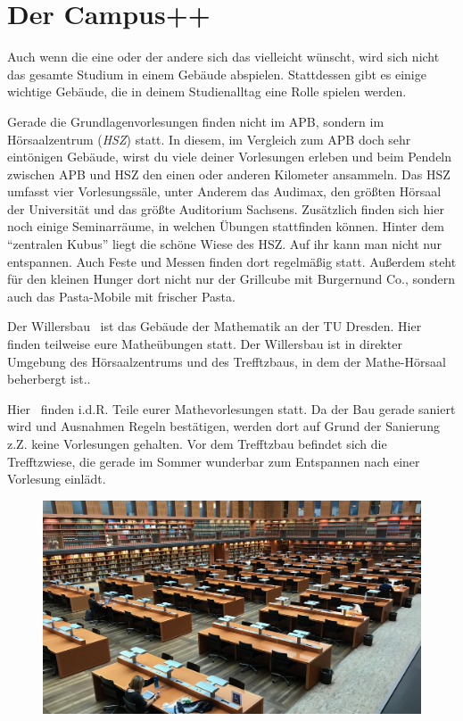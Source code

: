 \chapter*{Der Campus++}

Auch wenn die eine oder der andere sich das vielleicht wünscht, wird sich nicht das gesamte Studium in einem Gebäude abspielen.
Stattdessen gibt es einige wichtige Gebäude, die in deinem Studienalltag eine Rolle spielen werden.

Gerade die Grundlagenvorlesungen finden nicht im APB, sondern im Hörsaalzentrum (\emph{HSZ}) statt.
In diesem, im Vergleich zum APB doch sehr eintönigen Gebäude, wirst du viele deiner Vorlesungen erleben und beim Pendeln zwischen APB und HSZ den einen oder anderen Kilometer ansammeln.
Das HSZ umfasst vier Vorlesungssäle, unter Anderem das Audimax, den größten Hörsaal der Universität und das größte Auditorium Sachsens.
Zusätzlich finden sich hier noch einige Seminarräume, in welchen Übungen stattfinden können. Hinter dem \enquote{zentralen Kubus} liegt die schöne Wiese des HSZ. Auf ihr kann man nicht nur entspannen. Auch Feste und Messen finden dort regelmäßig statt.
Außerdem steht für den kleinen Hunger dort nicht nur
der Grillcube mit Burgernund Co., sondern auch das Pasta-Mobile mit frischer Pasta.

Der Willersbau~ ist das Gebäude der Mathematik an der TU Dresden. Hier finden teilweise eure Matheübungen statt. Der Willersbau ist in direkter Umgebung
des Hörsaalzentrums und des Trefftzbaus, in dem der Mathe-Hörsaal beherbergt ist..

Hier~ finden i.d.R. Teile eurer Mathevorlesungen statt. Da der Bau gerade saniert wird und Ausnahmen Regeln bestätigen, werden dort auf Grund der Sanierung z.Z. keine Vorlesungen gehalten. Vor dem Trefftzbau befindet sich die Trefftzwiese, die gerade im Sommer wunderbar zum Entspannen nach
einer Vorlesung einlädt.

\begin{figure}[b!]
    \centering
    \includegraphics[width=\linewidth]{img/slub-lesesaal}
\end{figure}

